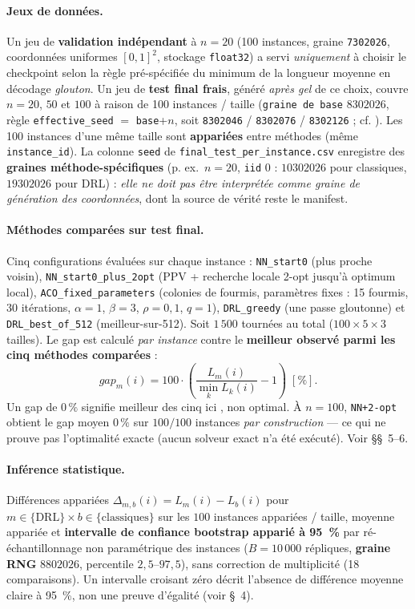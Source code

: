 \documentclass[12pt, a4paper, twoside, openright]{book}
\begin{document}
\paragraph{Jeux de données.} Un jeu de \textbf{validation indépendant} à $n=20$ (100 instances, graine \texttt{7302026}, coordonnées uniformes $[0,1]^2$, stockage \texttt{float32}) a servi \emph{uniquement} à choisir le checkpoint selon la règle pré-spécifiée du minimum de la longueur moyenne en décodage \emph{glouton}. Un jeu de \textbf{test final frais}, généré \emph{après gel} de ce choix, couvre $n=20$, $50$ et $100$ à raison de 100 instances / taille (\texttt{graine de base} $8302026$, règle \texttt{effective\_seed} $=$ \texttt{base}+$n$, soit \texttt{8302046} / \texttt{8302076} / \texttt{8302126} ; cf. ). Les 100 instances d'une même taille sont \textbf{appariées} entre méthodes (même \texttt{instance\_id}). La colonne \texttt{seed} de \texttt{final\_test\_per\_instance.csv} enregistre des \textbf{graines méthode-spécifiques} (p. ex.\ $n=20$, \texttt{iid} 0 : $10302026$ pour classiques, $19302026$ pour DRL) : \emph{elle ne doit pas être interprétée comme graine de génération des coordonnées}, dont la source de vérité reste le manifest.

\paragraph{Méthodes comparées sur test final.} Cinq configurations évaluées sur chaque instance : \texttt{NN\_start0} (plus proche voisin), \texttt{NN\_start0\_plus\_2opt} (PPV + recherche locale 2-opt jusqu'à optimum local), \texttt{ACO\_fixed\_parameters} (colonies de fourmis, paramètres fixes : 15 fourmis, 30 itérations, $\alpha=1$, $\beta=3$, $\rho=0{,}1$, $q=1$), \texttt{DRL\_greedy} (une passe gloutonne) et \texttt{DRL\_best\_of\_512} (meilleur-sur-512). Soit $1\,500$ tournées au total ($100 \times 5 \times 3$ tailles). Le gap est calculé \emph{par instance} contre le \textbf{meilleur observé parmi les cinq méthodes comparées} :
\[
\textit{gap}_{m}(i)=100\cdot\left(\frac{L_{m}(i)}{\min_{k}L_{k}(i)}-1\right)\;[\%].
\]
Un gap de $0\,\%$ signifie \og meilleur des cinq ici \fg{}, non optimal. À $n=100$, \texttt{NN+2-opt} obtient le gap moyen $0\,\%$ sur $100/100$ instances \emph{par construction} --- ce qui ne prouve pas l'optimalité exacte (aucun solveur exact n'a été exécuté). Voir  \S\S~5--6.

\paragraph{Inférence statistique.} Différences appariées $\Delta_{m,b}(i)=L_{m}(i)-L_{b}(i)$ pour $m\in\{\text{DRL}\}\times b\in\{\text{classiques}\}$ sur les $100$ instances appariées / taille, moyenne appariée et \textbf{intervalle de confiance bootstrap apparié à 95~\%} par ré-échantillonnage non paramétrique des instances ($B=10\,000$ répliques, \textbf{graine RNG} $8802026$, percentile $2{,}5$--$97{,}5$), sans correction de multiplicité (18 comparaisons). Un intervalle croisant zéro décrit l'absence de différence moyenne claire à 95~\%, non une preuve d'égalité (voir \S~4).
\end{document}

